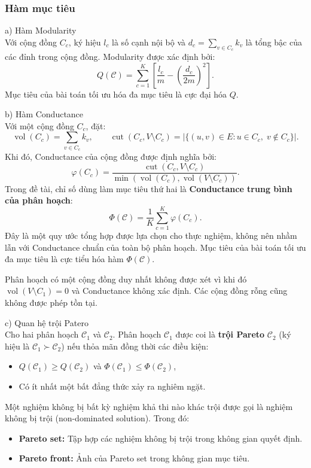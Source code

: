 \documentclass[14pt,a4paper]{extarticle}
\begin{document}
\subsubsection{Hàm mục tiêu}

\noindent a) Hàm Modularity
\noindent \\ 
Với cộng đồng $C_c$, ký hiệu $l_c$ là số cạnh nội bộ và $d_c=\sum_{v\in C_c}k_v$
 là tổng bậc của các đỉnh trong cộng đồng. Modularity được xác định bởi:
\[
Q(\mathcal{C})
=
\sum_{c=1}^{K}
\left[
\frac{l_c}{m}
-
\left(\frac{d_c}{2m}\right)^2
\right].
\]
Mục tiêu của bài toán tối ưu hóa đa mục tiêu là cực đại hóa $Q$.

\noindent b) Hàm Conductance
\noindent \\ 
Với một cộng đồng $C_c$, đặt: 
\[
\operatorname{vol}(C_c)=\sum_{v\in C_c}k_v,
\qquad
\operatorname{cut}(C_c,V\setminus C_c)
=
|\{(u,v)\in E:u\in C_c,\;v\notin C_c\}|.
\]
Khi đó, Conductance của cộng đồng được định nghĩa bởi:
\[
\varphi(C_c)
=
\frac{
\operatorname{cut}(C_c,V\setminus C_c)
}{
\min\left(
\operatorname{vol}(C_c),
\operatorname{vol}(V\setminus C_c)
\right)
}.
\]
Trong đề tài, chỉ số dùng làm mục tiêu thứ hai là \textbf{Conductance trung bình của phân hoạch}:
\[
\Phi(\mathcal{C})
=
\frac{1}{K}\sum_{c=1}^{K}\varphi(C_c).
\]
Đây là một quy ước tổng hợp được lựa chọn cho thực nghiệm, không nên nhầm lẫn với Conductance chuẩn của toàn bộ phân hoạch. Mục tiêu của bài toán tối ưu đa mục tiêu là cực tiểu hóa hàm $\Phi(\mathcal{C})$.

Phân hoạch có một cộng đồng duy nhất không được xét vì khi đó $\operatorname{vol}(V\setminus C_1)=0$ và Conductance không xác định. Các cộng đồng rỗng cũng không được phép tồn tại.


\noindent c) Quan hệ trội Patero
\\ 
Cho hai phân hoạch $\mathcal{C}_1$ và $\mathcal{C}_2$. Phân hoạch $\mathcal{C}_1$ được coi là \textbf{trội Pareto} $\mathcal{C}_2$ (ký hiệu là $\mathcal{C}_1 \succ \mathcal{C}_2$) nếu thỏa mãn đồng thời các điều kiện:
\begin{itemize}
    \item $Q(\mathcal{C}_1) \ge Q(\mathcal{C}_2)$ và $\Phi(\mathcal{C}_1) \le \Phi(\mathcal{C}_2)$,
    \item Có ít nhất một bất đẳng thức xảy ra nghiêm ngặt.
\end{itemize}

Một nghiệm không bị bất kỳ nghiệm khả thi nào khác trội được gọi là nghiệm không bị trội (non-dominated solution). Trong đó:
\begin{itemize}
    \item \textbf{Pareto set:} Tập hợp các nghiệm không bị trội trong không gian quyết định.
    \item \textbf{Pareto front:} Ảnh của Pareto set trong không gian mục tiêu.
\end{itemize}
\end{document}
